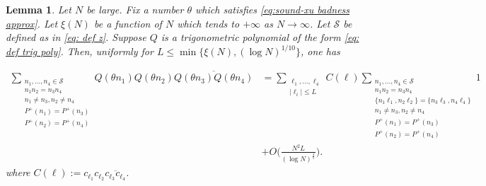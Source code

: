 \documentclass[12pt]{amsart}
\renewcommand{\leq}{\leqslant}
\numberwithin{equation}{section}
\theoremstyle{plain}
\newtheorem{lem}[thm]{Lemma}
\theoremstyle{definition}
\renewcommand{\l}{\ell}
\newcommand{\CS}{\mathcal{S}}
\begin{document}
	\begin{lem}\label{lem:reduction cond 2} Let $N$ be large. Fix a number $\theta$ which satisfies \eqref{eq:sound-xu badness approx}. Let $\xi(N)$ be a function of $N$ which tends to $+\infty$ as $N \to \infty$. Let $\CS$ be defined as in \eqref{eq: def z}. Suppose $Q$ is a trigonometric polynomial of the form \eqref{eq: def trig poly}. Then, uniformly for $L \leq \min\{\xi(N),(\log N)^{1/10}\}$, one has
		
		\begin{align*}
			\sum_{\substack{n_1,\dots,n_4 \in \CS \\ n_1n_2=n_3n_4 \\ n_1 \ne n_3,n_2 \ne n_4 \\ P^+(n_1)=P^+(n_3) \\ P^+(n_2) = P^+(n_4)}}Q(\theta n_1)Q(\theta n_2)\overline{Q(\theta n_3)Q(\theta n_4)} &= \sum_{\substack{\l_1,\dots,\l_4 \\ |\l_i| \leq L}}C(\bm{\l}) \sum_{\substack{n_1,\dots,n_4 \in \CS \\ n_1n_2=n_3n_4 \\ \{n_1\l_1,n_2\l_2\}=\{n_3\l_3,n_4\l_4\} \\ n_1 \ne n_3,n_2 \ne n_4 \\ P^+(n_1)=P^+(n_3) \\ P^+(n_2) = P^+(n_4) }} 1\\& +O\bigg(\frac{N^2L}{(\log N)^{ \frac{4}{5}}}\bigg).
		\end{align*}
		where $C(\bm{\l}) := c_{\l_1}c_{\l_2}\overline{c_{\l_3}c_{\l_4}}$. 
	\end{lem}
\end{document}
